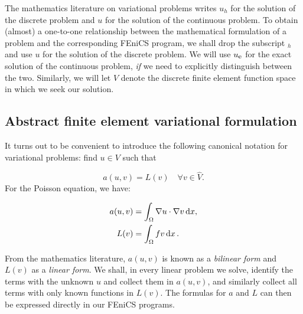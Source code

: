 \documentclass[graybox,envcountchap,sectrefs,final]{svmonodo}
\newenvironment{warning_mdfboxadmon}[1][]{
\begin{warning_mdfboxmdframed}[frametitle=#1]
}
{
\end{warning_mdfboxmdframed}
}
\begin{document}


\begin{warning_mdfboxadmon}
The mathematics literature on variational problems writes $u_h$ for
the solution of the discrete problem and $u$ for the solution of the
continuous problem. To obtain (almost) a one-to-one relationship
between the mathematical formulation of a problem and the
corresponding FEniCS program, we shall drop the subscript $_h$ and use
$u$ for the solution of the discrete problem.
We will use $u_{\mbox{\footnotesize e}}$ for the exact
solution of the continuous problem, \emph{if} we need to explicitly distinguish
between the two. Similarly, we will let $V$ denote the discrete finite
element function space in which we seek our solution.
\end{warning_mdfboxadmon} %



\subsection{Abstract finite element variational formulation}
\label{ch:poisson0:abstrat}

It turns out to be convenient to introduce the following canonical
notation for variational problems: find $u\in V$ such that

\begin{equation}
a(u, v) = L(v) \quad \forall v \in \hat{V}.
\end{equation}
For the Poisson equation, we have:

\begin{align}
a(u, v) &= \int_{\Omega} \nabla u \cdot \nabla v \, \mathrm{d}x,
\label{ch:poisson0:vard:a}\\
L(v) &= \int_{\Omega} fv \, \mathrm{d}x\thinspace .  \label{ch:poisson0:vard:L}
\end{align}

From the mathematics literature, $a(u,v)$ is known as a \emph{bilinear
form} and $L(v)$ as a \emph{linear form}.  We shall, in every linear problem
we solve, identify the terms with the unknown $u$ and collect them in
$a(u,v)$, and similarly collect all terms with only known functions in
$L(v)$. The formulas for $a$ and $L$ can then be expressed directly in
our FEniCS programs.
\end{document}
